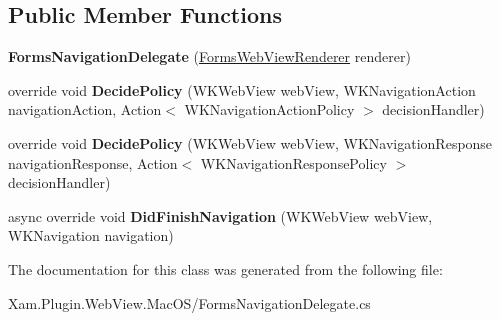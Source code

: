 \subsection*{Public Member Functions}
\begin{DoxyCompactItemize}
\item 
\mbox{\label{class_xam_1_1_plugin_1_1_web_view_1_1_mac_o_s_1_1_forms_navigation_delegate_ac30e3c87acbd78c14d35ec4d3c62a2ba}} 
{\bfseries Forms\+Navigation\+Delegate} (\hyperlink{class_xam_1_1_plugin_1_1_web_view_1_1_mac_o_s_1_1_forms_web_view_renderer}{Forms\+Web\+View\+Renderer} renderer)
\item 
\mbox{\label{class_xam_1_1_plugin_1_1_web_view_1_1_mac_o_s_1_1_forms_navigation_delegate_a1a0257f85ebe9e9237532eddd22f50ec}} 
override void {\bfseries Decide\+Policy} (W\+K\+Web\+View web\+View, W\+K\+Navigation\+Action navigation\+Action, Action$<$ W\+K\+Navigation\+Action\+Policy $>$ decision\+Handler)
\item 
\mbox{\label{class_xam_1_1_plugin_1_1_web_view_1_1_mac_o_s_1_1_forms_navigation_delegate_a27ea8c780b326ec03ab22fb6559eaecb}} 
override void {\bfseries Decide\+Policy} (W\+K\+Web\+View web\+View, W\+K\+Navigation\+Response navigation\+Response, Action$<$ W\+K\+Navigation\+Response\+Policy $>$ decision\+Handler)
\item 
\mbox{\label{class_xam_1_1_plugin_1_1_web_view_1_1_mac_o_s_1_1_forms_navigation_delegate_a882c0732124afa6be16bba018ee3cb51}} 
async override void {\bfseries Did\+Finish\+Navigation} (W\+K\+Web\+View web\+View, W\+K\+Navigation navigation)
\end{DoxyCompactItemize}


The documentation for this class was generated from the following file\+:\begin{DoxyCompactItemize}
\item 
Xam.\+Plugin.\+Web\+View.\+Mac\+O\+S/Forms\+Navigation\+Delegate.\+cs\end{DoxyCompactItemize}
